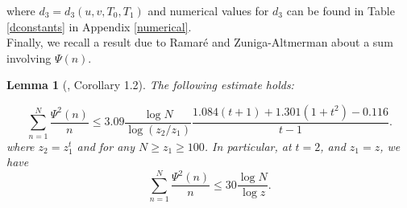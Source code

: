 \documentclass[reqno]{amsart}
\newtheorem{lemma}[theorem]{Lemma}
\numberwithin{equation}{section}
\theoremstyle{remark}
\begin{document}
    where $d_3=d_3(u,v,T_0,T_1)$ and numerical values for $d_3$ can be found in Table \ref{dconstants} in Appendix \ref{numerical}.\\
    Finally, we recall a result due to Ramaré and Zuniga-Altmerman about a sum involving $\Psi(n)$.
    \begin{lemma}[\cite{ramaré2024l2bound}, Corollary 1.2]\label{ramarepreprint}
   The following estimate holds:
   
   \begin{equation}\label{ramaresebnew}
\sum_{n=1}^{N} \frac{\Psi^2(n)}{n}\le 3.09 \frac{\log N}{\log \left(z_2 / z_1\right)} \frac{1.084(t+1)+1.301\left(1+t^2\right)-0.116}{t-1} .
\end{equation}
where $z_2=z_1^t$ and for any $N\ge z_1\ge 100$. In particular, at $t=2$, and $z_1=z$, we have 
\[
\sum_{n=1}^{N} \frac{\Psi^2(n)}{n}\le 30\frac{\log N}{\log z}.
\]
\end{lemma}
\end{document}

